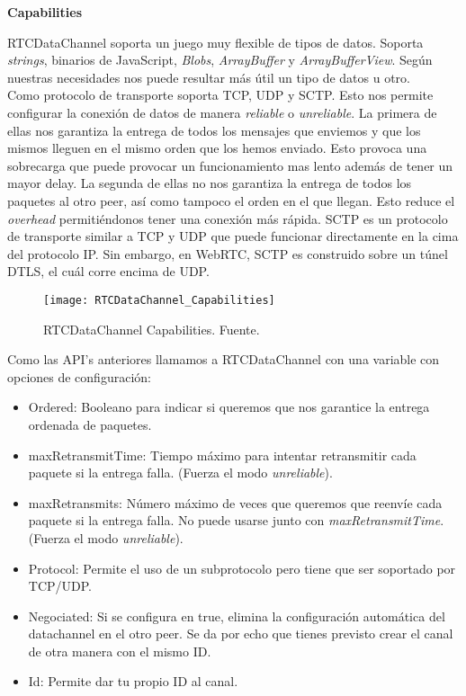 \begin{normalsize}
\noindent \textbf{Capabilities}\\
\end{normalsize}

RTCDataChannel soporta un juego muy flexible de tipos de datos. Soporta \textit{strings}, binarios de JavaScript, \textit{Blobs}, \textit{ArrayBuffer} y \textit{ArrayBufferView}. Según nuestras necesidades nos puede resultar más útil un tipo de datos u otro.\\

Como protocolo de transporte soporta TCP, UDP y SCTP. Esto nos permite configurar la conexión de datos de manera \textit{reliable} o \textit{unreliable}. La primera de ellas nos garantiza la entrega de todos los mensajes que enviemos y que los mismos lleguen en el mismo orden que los hemos enviado. Esto provoca una sobrecarga que puede provocar un funcionamiento mas lento además de tener un mayor delay. La segunda de ellas no nos garantiza la entrega de todos los paquetes al otro peer, así como tampoco el orden en el que llegan. Esto reduce el \textit{overhead} permitiéndonos tener una conexión más rápida. SCTP es un protocolo de transporte similar a TCP y UDP que puede funcionar directamente en la cima del protocolo IP. Sin embargo, en WebRTC, SCTP es construido sobre un túnel DTLS, el cuál corre encima de UDP.

\begin{figure}[htb]
\centering
\texttt{[image: RTCDataChannel\_Capabilities]}
\caption{RTCDataChannel Capabilities. Fuente.\protect\footnotemark }
\label{fig:datachannel_capabilities}
\end{figure}

\noindent Como las API's anteriores llamamos a RTCDataChannel con una variable con opciones de configuración:

\begin{itemize}
\item Ordered: Booleano para indicar si queremos que nos garantice la entrega ordenada de paquetes.
\item maxRetransmitTime: Tiempo máximo para intentar retransmitir cada paquete si la entrega falla. (Fuerza el modo \textit{unreliable}).
\item maxRetransmits: Número máximo de veces que queremos que reenvíe cada paquete si la entrega falla. No puede usarse junto con \textit{maxRetransmitTime}. (Fuerza el modo \textit{unreliable}).
\item Protocol: Permite el uso de un subprotocolo pero tiene que ser soportado por TCP/UDP.
\item Negociated: Si se configura en true, elimina la configuración automática del datachannel en el otro peer. Se da por echo que tienes previsto crear el canal de otra manera con el mismo ID.
\item Id: Permite dar tu propio ID al canal.
\end{itemize}

